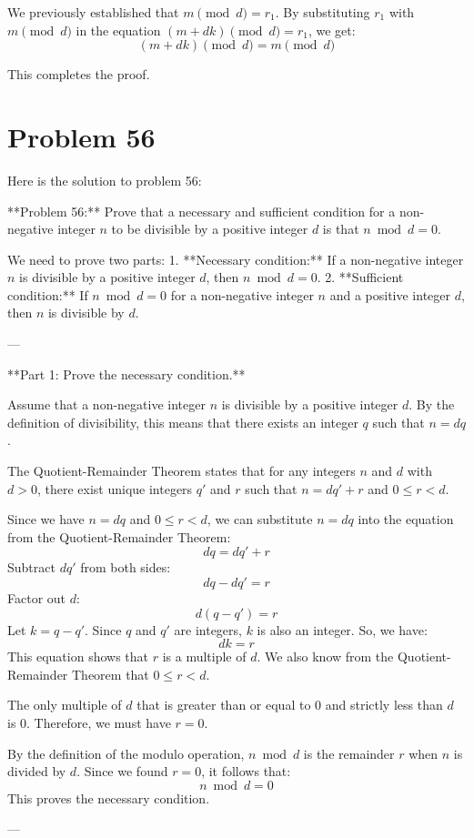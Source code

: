 \documentclass{article}
\begin{document}
We previously established that $m \pmod d = r_1$.
By substituting $r_1$ with $m \pmod d$ in the equation $(m + dk) \pmod d = r_1$, we get:
$$(m + dk) \pmod d = m \pmod d$$

This completes the proof.

\newpage

\section*{Problem 56}
Here is the solution to problem 56:

**Problem 56:** Prove that a necessary and sufficient condition for a non-negative integer $n$ to be divisible by a positive integer $d$ is that $n \bmod d = 0$.

We need to prove two parts:
1.  **Necessary condition:** If a non-negative integer $n$ is divisible by a positive integer $d$, then $n \bmod d = 0$.
2.  **Sufficient condition:** If $n \bmod d = 0$ for a non-negative integer $n$ and a positive integer $d$, then $n$ is divisible by $d$.

---

**Part 1: Prove the necessary condition.**

Assume that a non-negative integer $n$ is divisible by a positive integer $d$.
By the definition of divisibility, this means that there exists an integer $q$ such that $n = dq$.

The Quotient-Remainder Theorem states that for any integers $n$ and $d$ with $d > 0$, there exist unique integers $q'$ and $r$ such that $n = dq' + r$ and $0 \le r < d$.

Since we have $n = dq$ and $0 \le r < d$, we can substitute $n = dq$ into the equation from the Quotient-Remainder Theorem:
$$ dq = dq' + r $$
Subtract $dq'$ from both sides:
$$ dq - dq' = r $$
Factor out $d$:
$$ d(q - q') = r $$
Let $k = q - q'$. Since $q$ and $q'$ are integers, $k$ is also an integer.
So, we have:
$$ dk = r $$
This equation shows that $r$ is a multiple of $d$.
We also know from the Quotient-Remainder Theorem that $0 \le r < d$.

The only multiple of $d$ that is greater than or equal to 0 and strictly less than $d$ is 0.
Therefore, we must have $r = 0$.

By the definition of the modulo operation, $n \bmod d$ is the remainder $r$ when $n$ is divided by $d$.
Since we found $r=0$, it follows that:
$$ n \bmod d = 0 $$
This proves the necessary condition.

---
\end{document}
